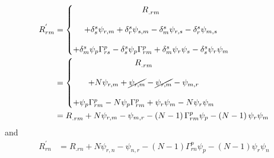 \begin{align}
R^{'}_{rm} &= \left\{\begin{matrix}
R^{}_{.rm}\\\\
+\delta^s_s\psi_{r,m} +\delta^s_r\psi_{s,m}-\delta^s_m\psi_{r,s} -\delta^s_r\psi_{m,s}\\\\
+\delta^s_m\psi_p\Gamma^{p}_{rs} 
-\delta^s_s\psi_p \Gamma^{p}_{rm}
+\delta^s_m\psi_r\psi_s  -\delta^s_s\psi_r\psi_m 
\end{matrix}\right.\\
&=\left\{\begin{matrix}
R^{}_{.rm}\\\\
+N\psi_{r,m} +\cancel{\psi_{r,m}}-\cancel{\psi_{r,m}} -\psi_{m,r}\\\\
+\psi_p\Gamma^{p}_{rm} 
-N\psi_p \Gamma^{p}_{rm}
+\psi_r\psi_m  -N\psi_r\psi_m 
\end{matrix}\right.\\
&=R^{}_{.rm}
+N\psi_{r,m} -\psi_{m,r} -\left(N-1\right) \Gamma^{p}_{rm}\psi_p
-\left(N-1\right)\psi_r\psi_m  
\end{align}
and
\begin{align}
R^{'}_{rn} &=R^{}_{.rn}
+N\psi_{r,n} -\psi_{n,r} -\left(N-1\right) \Gamma^{p}_{rn}\psi_p
-\left(N-1\right)\psi_r\psi_n  
\end{align}


